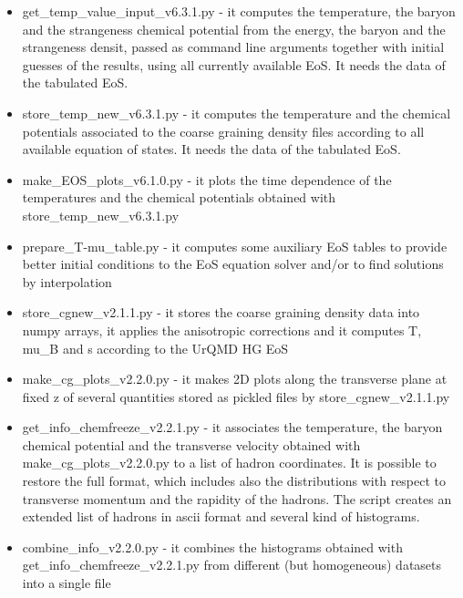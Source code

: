 \documentclass[12pt, a4paper]{article}
\begin{document}
\begin{itemize}
	\item  get\_temp\_value\_input\_v6.3.1.py - it computes the temperature, the baryon and the strangeness chemical potential from the energy, the baryon and the strangeness densit, passed as command line arguments together with initial guesses of the results, using all currently available EoS. It needs the data of the tabulated EoS.
	
	\item store\_temp\_new\_v6.3.1.py - it computes the temperature and the chemical potentials associated to the coarse graining density files according to all available equation of states. It needs the data of the tabulated EoS.
	
	\item make\_EOS\_plots\_v6.1.0.py - it plots the time dependence of the temperatures and the chemical potentials obtained with store\_temp\_new\_v6.3.1.py
	
	\item prepare\_T-mu\_table.py - it computes some auxiliary EoS tables to provide better initial conditions to the EoS equation solver and/or to find solutions by interpolation
	
	\item store\_cgnew\_v2.1.1.py - it stores the coarse graining density data into numpy arrays, it applies the anisotropic corrections and it computes T, mu\_B and s according to the UrQMD HG EoS
	
	\item make\_cg\_plots\_v2.2.0.py - it makes 2D plots along the transverse plane at fixed z of several quantities stored as pickled files by store\_cgnew\_v2.1.1.py
	
	\item get\_info\_chemfreeze\_v2.2.1.py - it associates the temperature, the baryon chemical potential and the transverse velocity obtained with make\_cg\_plots\_v2.2.0.py to a list of hadron coordinates. It is possible to restore the full format, which includes also the distributions with respect to transverse momentum and the rapidity of the hadrons. The script creates an extended list of hadrons in ascii format and several kind of histograms.
	
	\item combine\_info\_v2.2.0.py - it combines the histograms obtained with\\get\_info\_chemfreeze\_v2.2.1.py from different (but homogeneous) datasets into a single file
	

\end{itemize}
\end{document}

